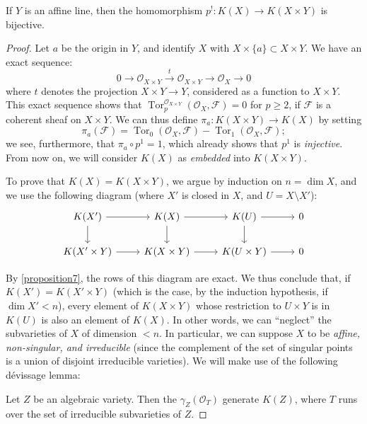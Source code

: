 \documentclass{article}
\theoremstyle{plain}
\newenvironment{proposition}[1]
    {\renewcommand\theinnercustomproposition{#1}\innercustomproposition}
    {\endinnercustomproposition}
\newenvironment{lemma}[1]
    {\renewcommand\theinnercustomlemma{#1}\innercustomlemma}
    {\endinnercustomlemma}
\theoremstyle{definition}
\newcommand{\sh}[1]{{\mathscr{#1}}}
\renewcommand{\geq}{\geqslant}
\DeclareMathOperator{\Tor}{Tor}
\newcommand{\oldpage}[1]{\marginpar{\footnotesize$\Big\vert$ \textit{p.~#1}}}
\begin{document}
\begin{proposition}{8}
\label{proposition8}
  If $Y$ is an affine line, then the homomorphism $p^!\colon K(X)\to K(X\times Y)$ is bijective.
\end{proposition}

\begin{proof}
  Let $a$ be the origin in $Y$, and identify $X$ with $X\times\{a\}\subset X\times Y$.
  We have an exact sequence:
  \[
    0 \to \sh{O}_{X\times Y} \xrightarrow{t} \sh{O}_{X\times Y} \to \sh{O}_X \to 0
  \]
  where $t$ denotes the projection $X\times Y\to Y$, considered as a function to $X\times Y$.
  This exact sequence shows that $\Tor_p^{\sh{O}_{X\times Y}}(\sh{O}_X,\sh{F})=0$ for $p\geq2$, if $\sh{F}$ is a coherent sheaf on $X\times Y$.
  We can thus define $\pi_a\colon K(X\times Y)\to K(X)$ by setting
  \[
    \pi_a(\sh{F}) = \Tor_0(\sh{O}_X,\sh{F}) - \Tor_1(\sh{O}_X,\sh{F});
  \]
  we see, furthermore, that $\pi_a\circ p^1=1$, which already shows that $p^1$ is \emph{injective}.
  From now on, we will consider $K(X)$ as \emph{embedded} into $K(X\times Y)$.

  To prove that $K(X)=K(X\times Y)$, we argue by induction on $n=\dim X$, and we use the following diagram (where $X'$ is closed in $X$, and $U=X\setminus X'$):
  \[
    \begin{tikzcd}
      K(X') \rar \dar
      & K(X) \rar \dar
      & K(U) \rar \dar
      & 0
    \\K(X'\times Y) \rar
      & K(X\times Y) \rar
      & K(U\times Y) \rar
      & 0
    \end{tikzcd}
  \]

\oldpage{117}
  By \cref{proposition7}, the rows of this diagram are exact.
  We thus conclude that, if $K(X')=K(X'\times Y)$ (which is the case, by the induction hypothesis, if $\dim X'<n$), every element of $K(X\times Y)$ whose restriction to $U\times Y$ is in $K(U)$ is also an element of $K(X)$.
  In other words, we can ``neglect'' the subvarieties of $X$ of dimension $<n$.
  In particular, we can suppose $X$ to be \emph{affine, non-singular, and irreducible} (since the complement of the set of singular points is a union of disjoint irreducible varieties).
  We will make use of the following d\'{e}vissage lemma:

  \begin{lemma}{17}
  \label{lemma17}
    Let $Z$ be an algebraic variety.
    Then the $\gamma_Z(\sh{O}_T)$ generate $K(Z)$, where $T$ runs over the set of irreducible subvarieties of $Z$.
  \end{lemma}


\end{proof}
\end{document}
